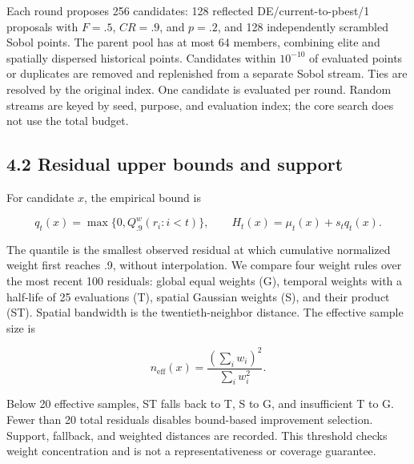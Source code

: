 \documentclass[11pt,a4paper]{article}
\begin{document}
Each round proposes 256 candidates: 128 reflected DE/current-to-pbest/1
proposals with \(F=.5\), \(CR=.9\), and \(p=.2\), and 128 independently
scrambled Sobol points. The parent pool has at most 64 members,
combining elite and spatially dispersed historical points. Candidates
within \(10^{-10}\) of evaluated points or duplicates are removed and
replenished from a separate Sobol stream. Ties are resolved by the
original index. One candidate is evaluated per round. Random streams are
keyed by seed, purpose, and evaluation index; the core search does not
use the total budget.

\par{}\noindent\begin{minipage}{\linewidth}

\hypertarget{residual-upper-bounds-and-support}{%
\subsection{4.2 Residual upper bounds and
support}\label{residual-upper-bounds-and-support}}

For candidate \(x\), the empirical bound is

\[q_t(x)=\max\{0,Q^w_{.9}(r_i:i<t)\},\qquad H_t(x)=\mu_t(x)+s_tq_t(x).\]

\end{minipage}\par

\par\noindent\begin{minipage}{\linewidth}

The quantile is the smallest observed residual at which cumulative
normalized weight first reaches .9, without interpolation. We compare
four weight rules over the most recent 100 residuals: global equal
weights (G), temporal weights with a half-life of 25 evaluations (T),
spatial Gaussian weights (S), and their product (ST). Spatial bandwidth
is the twentieth-neighbor distance. The effective sample size is

\[n_{\mathrm{eff}}(x)=\frac{(\sum_iw_i)^2}{\sum_iw_i^2}.\]

\end{minipage}\par

Below 20 effective samples, ST falls back to T, S to G, and insufficient
T to G. Fewer than 20 total residuals disables bound-based improvement
selection. Support, fallback, and weighted distances are recorded. This
threshold checks weight concentration and is not a representativeness or
coverage guarantee.
\end{document}
